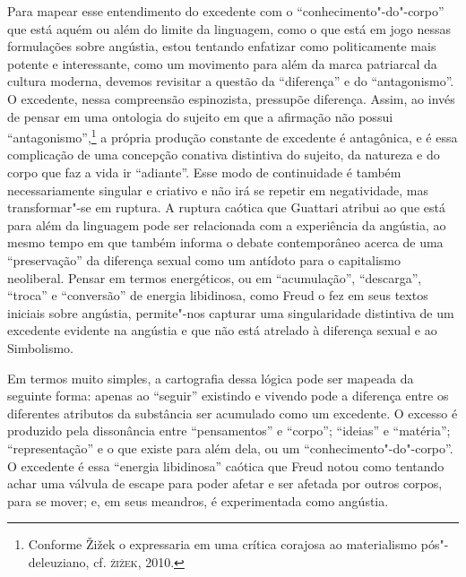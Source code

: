 Para mapear esse entendimento do excedente com o
``conhecimento"-do"-corpo'' que está aquém ou além do limite da linguagem,
como o que está em jogo nessas formulações sobre angústia, estou
tentando enfatizar como politicamente mais potente e interessante, como
um movimento para além da marca patriarcal da cultura moderna, devemos
revisitar a questão da ``diferença'' e do ``antagonismo''. O excedente,
nessa compreensão espinozista, pressupõe diferença. Assim, ao invés de
pensar em uma ontologia do sujeito em que a afirmação não possui
``antagonismo'',\footnote{Conforme Žižek o expressaria em uma crítica corajosa ao
materialismo pós"-deleuziano, cf. \textsc{žižek}, 2010.} a própria produção
constante de excedente é antagônica, e é essa complicação de uma
concepção conativa distintiva do sujeito, da natureza e do corpo que faz
a vida ir ``adiante''. Esse modo de continuidade é também
necessariamente singular e criativo e não irá se repetir em
negatividade, mas transformar"-se em ruptura. A ruptura caótica que
Guattari atribui ao que está para além da linguagem pode ser relacionada
com a experiência da angústia, ao mesmo tempo em que também informa o
debate contemporâneo acerca de uma ``preservação'' da diferença sexual
como um antídoto para o capitalismo neoliberal. Pensar em termos
energéticos, ou em ``acumulação'', ``descarga'', ``troca'' e
``conversão'' de energia libidinosa, como Freud o fez em seus textos
iniciais sobre angústia, permite"-nos capturar uma singularidade
distintiva de um excedente evidente na angústia e que não está atrelado
à diferença sexual e ao Simbolismo.

Em termos muito simples, a cartografia dessa lógica pode ser mapeada da
seguinte forma: apenas ao ``seguir'' existindo e vivendo pode a
diferença entre os diferentes atributos da substância ser acumulado como
um excedente. O excesso é produzido pela dissonância entre
``pensamentos'' e ``corpo''; ``ideias'' e ``matéria''; ``representação''
e o que existe para além dela, ou um ``conhecimento"-do"-corpo''. O
excedente é essa ``energia libidinosa'' caótica que Freud notou como
tentando achar uma válvula de escape para poder afetar e ser afetada por
outros corpos, para se mover; e, em seus meandros, é experimentada como
angústia.

